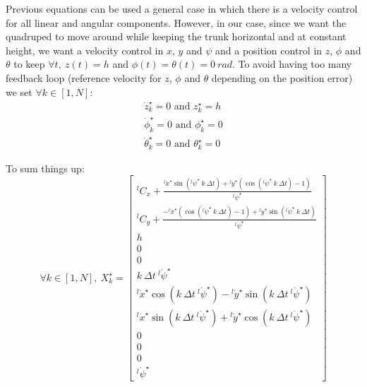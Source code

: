 \documentclass[a4paper,11pt]{article}
\begin{document}

Previous equations can be used a general case in which there is a velocity control for all linear and angular components. However, in our case, since we want the quadruped to move around while keeping the trunk horizontal and at constant height, we want a velocity control in $x$, $y$ and $\psi$ and a position control in $z$, $\phi$ and $\theta$ to keep $\forall t, ~z(t) = h$ and $\phi(t) = \theta(t) = 0~rad$. To avoid having too many feedback loop (reference velocity for $z$, $\phi$ and $\theta$ depending on the position error) we set $\forall k \in [1, N]$:
\begin{align}
\dot z_k^\star = 0 \text{ and } z_k^\star = h \\
\dot \phi_k^\star = 0 \text{ and }  \phi_k^\star = 0 \\
\dot \theta_k^\star = 0 \text{ and }  \theta_k^\star = 0
\end{align}

To sum things up:
\begin{equation}
	\forall k \in [1, N], ~ X_k^\star = \begin{bmatrix}
	{}^l\! C_x + \frac{{}^l\!\dot x^\star \sin({}^l\!\dot \psi^\star ~ k ~ \Delta t) + {}^l\!\dot y^\star \left( \cos({}^l\!\dot \psi^\star ~ k ~ \Delta t) - 1 \right)}{{}^l\!\dot \psi^\star} \\
	{}^l\! C_y + \frac{- {}^l\!\dot x^\star \left( \cos({}^l\!\dot \psi^\star ~ k ~ \Delta t) - 1 \right) + {}^l\!\dot y^\star \sin({}^l\!\dot \psi^\star ~ k ~ \Delta t)}{{}^l\!\dot \psi^\star} \\
	h \\ 0 \\ 0 \\ k ~ \Delta t ~  {}^l\! \dot \psi^\star \\
	{}^l\! \dot x^\star \cos(k ~ \Delta t ~  {}^l\! \dot \psi^\star) - {}^l\! \dot y^\star \sin(k ~ \Delta t ~  {}^l\! \dot \psi^\star) \\
	{}^l\! \dot x^\star \sin(k ~ \Delta t ~  {}^l\! \dot \psi^\star) + {}^l\! \dot y^\star \cos(k ~ \Delta t ~  {}^l\! \dot \psi^\star) \\ 0 \\ 0 \\ 0 \\ {}^l\! \dot \psi^\star
	\end{bmatrix}
\end{equation}
\end{document}
